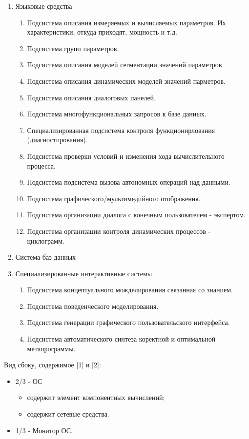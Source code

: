 \documentclass[a4paper,12pt]{report}
\begin{document}
	\begin{enumerate}
		\item Языковые средства
			\begin{enumerate}
				\item Подсистема описания измеряемых и вычисляемых параметров.
					Их характеристики, откуда приходят, мощность и т.д.
				\item Подсистема групп параметров.
				\item Подсистема описания моделей сегментации значений параметров.
				\item Подсистема описания динамических моделей значений парметров.
				\item Подсистема описания диалоговых панелей.
				\item Подсистема многофункциональных запросов к базе данных.
				\item Специализированная подсистема контроля функционирлования
					(диагностирования).
				\item Подсистема проверки условий и изменения хода вычислительного
					процесса.
				\item Подсистема подсистема вызова автономных операций над данными.
				\item Подсистема графического/мультимедийного отображения.
				\item Подсистема организации диалога с конечным пользователем -
					экспертом.
				\item Подсистема организации контроля динамических процессов -
					циклограмм.
			\end{enumerate}
		\item Система баз данных
		\item Специализированные интерактивные системы
			\begin{enumerate}
				\item Подсистема концептуального можделирования связанная со знанием.
				\item Подсистема поведенческого моделирования.
				\item Подсистема генерации графического пользовательского интерфейса.
				\item Подсистема автоматического синтеза коректной и оптимальной
					метапрограммы.
			\end{enumerate}
	\end{enumerate}

	Вид сбоку, содержимое [1] и [2]:

	\begin{itemize}
		\item 2/3 - ОС
			\begin{itemize}
				\item содержит элемент компонентных вычислений;
				\item содержит сетевые средства.
			\end{itemize}
		\item 1/3 - Монитор ОС.
	\end{itemize}
\end{document}
